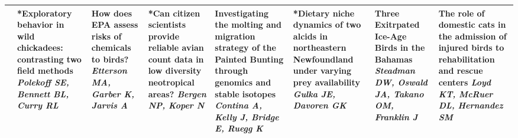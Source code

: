 \begin{tabular}{|x{0.85cm}|x{2.85cm}|x{2.85cm}|x{2.85cm}|x{2.85cm}|x{2.85cm}|x{2.85cm}|a{2.85cm}|}
&*Exploratory behavior in wild chickadees: contrasting two field methods \newline \newline \textit{Polekoff SE, Bennett BL, Curry RL} & How does EPA assess risks of chemicals to birds? \newline \newline \textit{Etterson MA, Garber K, Jarvis A} & *Can citizen scientists provide reliable avian count data in low diversity neotropical areas? \newline \newline \textit{Bergen NP, Koper N} & Investigating the molting and migration strategy of the Painted Bunting through genomics and stable isotopes \newline \newline \textit{Contina A, Kelly J, Bridge E, Ruegg K} & *Dietary niche dynamics of two alcids in northeastern Newfoundland under varying prey availability \newline \newline \textit{Gulka JE, Davoren GK} & Three Exitrpated Ice-Age Birds in the Bahamas \newline \newline \textit{Steadman DW, Oswald JA, Takano OM, Franklin J} & The role of domestic cats in the admission of injured birds to rehabilitation and rescue centers \newline \newline \textit{Loyd KT, McRuer DL, Hernandez SM}\\
\hline

\end{tabular}
